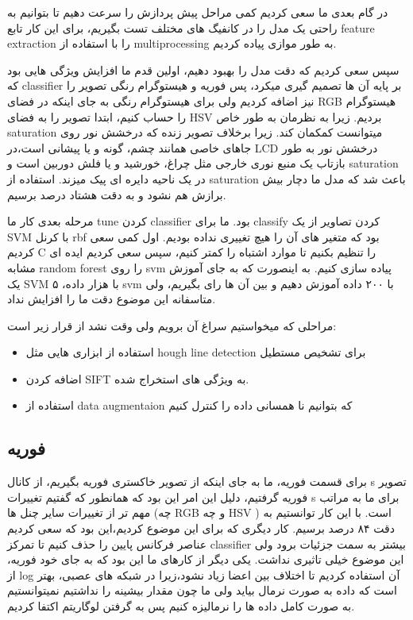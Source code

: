 \documentclass{article}
\begin{document}
	در گام بعدی ما سعی کردیم کمی مراحل پیش پردازش را سرعت دهیم تا بتوانیم به راحتی یک مدل را در کانفیگ های مختلف تست بگیریم، برای این کار تابع feature extraction را با استفاده از multiprocessing به طور موازی پیاده کردیم.
	
	سپس سعی کردیم که دقت مدل را بهبود دهیم، اولین قدم ما افزایش ویژگی هایی بود که classifier بر پایه آن ها تصمیم گیری میکرد، پس فوریه و هیستوگرام رنگی تصویر را نیز اضافه کردیم ولی برای هیستوگرام رنگی به جای اینکه در فضای RGB هیستوگرام را حساب کنیم،‌ ابتدا تصویر را به فضای HSV بردیم. زیرا به نظرمان به طور خاص saturation میتوانست کمکمان کند. زیرا برخلاف تصویر زنده که درخشش نور روی جاهای خاصی همانند چشم، گونه و یا پیشانی است،‌در LCD درخشش نور به طور بازتاب یک منبع نوری خارجی مثل چراغ، خورشید و یا فلش دوربین است و saturation در یک ناحیه دایره ای پیک میزند. استفاده از saturation باعث شد که مدل ما دچار بیش برازش هم نشود و به دقت هشتاد درصد برسیم.
	
	مرحله بعدی کار ما tune کردن classifier بود. ما برای classify کردن تصاویر از یک SVM با کرنل rbf بود که متغیر های آن را هیچ تغییری نداده بودیم.
	اول کمی سعی کردیم C را تنظیم بکنیم تا موارد اشتباه را کمتر کنیم،‌ سپس سعی کردیم ایده ای مشابه random forest را روی svm پیاده سازی کنیم. به اینصورت که به جای آموزش یک SVM با هزار داده، ۵ svm با ۲۰۰ داده آموزش دهیم و بین آن ها رای بگیریم، ولی متاسفانه این موضوع دقت ما را افزایش نداد.
	
	مراحلی که میخواستیم سراغ آن برویم ولی وقت نشد از قرار زیر است:
	\begin{itemize}
		\item استفاده از ابزاری هایی مثل hough line detection برای تشخیص مستطیل
		\item اضافه کردن SIFT به ویژگی های استخراج شده.
		\item استفاده از data augmentaion که بتوانیم نا همسانی داده را کنترل کنیم
	\end{itemize}
	\subsection{فوریه}
	برای قسمت فوریه، ما به جای اینکه از تصویر خاکستری فوریه بگیریم، از کانال s تصویر فوریه گرفتیم، دلیل این امر این بود که همانطور که گفتیم تغییرات s برای ما به مراتب مهم تر از تغییرات سایر چنل ها (چه RGB و چه HSV ) است. با این کار توانستیم به دقت ۸۴ درصد برسیم. 
	کار دیگری که برای این موضوع کردیم،‌این بود که سعی کردیم عناصر فرکانس پایین را حذف کنیم تا تمرکز classifier بیشتر به سمت جزئیات برود ولی این موضوع خیلی تاثیری نداشت.
	یکی دیگر از کارهای ما این بود که به جای خود فوریه، از log آن استفاده کردیم تا اختلاف بین اعضا زیاد نشود،‌زیرا در شبکه های عصبی، بهتر است که داده به صورت نرمال بیاید ولی ما چون مقدار بیشینه را نداشتیم نمیتوانستیم به صورت کامل داده ها را نرمالیزه کنیم پس به گرفتن لوگاریتم اکتفا کردیم.
	
\end{document}
